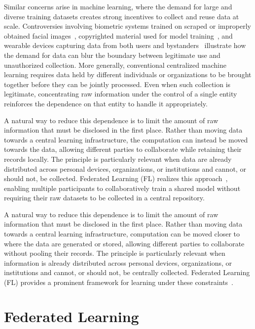Similar concerns arise in machine learning, where the demand for large and diverse training datasets creates strong incentives to collect and reuse data at scale. Controversies involving biometric systems trained on scraped or improperly obtained facial images~, copyrighted material used for model training~, and wearable devices capturing data from both users and bystanders~ illustrate how the demand for data can blur the boundary between legitimate use and unauthorized collection. More generally, conventional centralized machine learning requires data held by different individuals or organizations to be brought together before they can be jointly processed. Even when such collection is legitimate, concentrating raw information under the control of a single entity reinforces the dependence on that entity to handle it appropriately.

A natural way to reduce this dependence is to limit the amount of raw information that must be disclosed in the first place. Rather than moving data towards a central learning infrastructure, the computation can instead be moved towards the data, allowing different parties to collaborate while retaining their records locally. The principle is particularly relevant when data are already distributed across personal devices, organizations, or institutions and cannot, or should not, be collected. Federated Learning (FL) realizes this approach~\cite{pmlr-v54-mcmahan17a}, enabling multiple participants to collaboratively train a shared model without requiring their raw datasets to be collected in a central repository.

A natural way to reduce this dependence is to limit the amount of raw information that must be disclosed in the first place. Rather than moving data towards a central learning infrastructure, computation can be moved closer to where the data are generated or stored, allowing different parties to collaborate without pooling their records. The principle is particularly relevant when information is already distributed across personal devices, organizations, or institutions and cannot, or should not, be centrally collected. Federated Learning (FL) provides a prominent framework for learning under these constraints~\cite{pmlr-v54-mcmahan17a}.


\section{Federated Learning} \label{sec:fed_learning}

